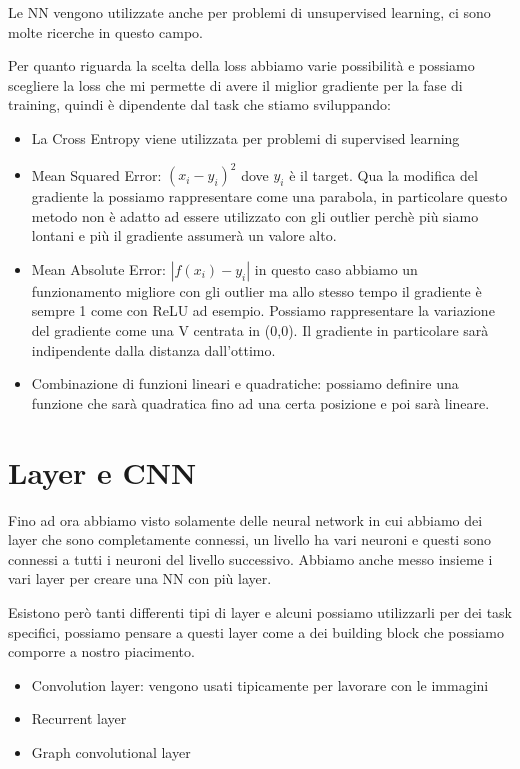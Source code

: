 \documentclass[14pt]{extreport}
\begin{document}
Le NN vengono utilizzate anche per problemi di unsupervised learning, ci sono molte ricerche in questo campo.

Per quanto riguarda la scelta della loss abbiamo varie possibilità e possiamo scegliere la loss che mi permette di avere il miglior gradiente per la
fase di training, quindi è dipendente dal task che stiamo sviluppando:

\begin{itemize}
\item La Cross Entropy viene utilizzata per problemi di supervised learning
\item Mean Squared Error: $(x_i-y_i)^2$ dove $y_i$ è il target. Qua la modifica del gradiente la possiamo rappresentare come una parabola, in
particolare questo metodo non è adatto ad essere utilizzato con gli outlier perchè più siamo lontani e più il gradiente assumerà un valore alto.
\item Mean Absolute Error: $|f(x_i)-y_i|$ in questo caso abbiamo un funzionamento migliore con gli outlier ma allo stesso tempo il gradiente è sempre
1 come con ReLU ad esempio. Possiamo rappresentare la variazione del gradiente come una V centrata in (0,0). Il gradiente in particolare sarà
indipendente dalla distanza dall'ottimo.
\item Combinazione di funzioni lineari e quadratiche: possiamo definire una funzione che sarà quadratica fino ad una certa posizione e poi sarà
lineare.
\end{itemize}


\section{Layer e CNN}

Fino ad ora abbiamo visto solamente delle neural network in cui abbiamo dei layer che sono completamente connessi, un livello ha vari neuroni e questi
sono connessi a tutti i neuroni del livello successivo. Abbiamo anche messo insieme i vari layer per creare una NN con più layer.

Esistono però tanti differenti tipi di layer e alcuni possiamo utilizzarli per dei task specifici, possiamo pensare a questi layer come a dei building
block che possiamo comporre a nostro piacimento.
\begin{itemize}
\item Convolution layer: vengono usati tipicamente per lavorare con le immagini
\item Recurrent layer
\item Graph convolutional layer
\end{itemize}
 
\end{document}
